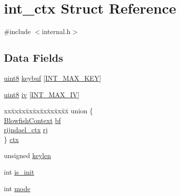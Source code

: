 \hypertarget{structint__ctx}{\section{int\-\_\-ctx Struct Reference}
\label{structint__ctx}
}


{\ttfamily \#include $<$internal.\-h$>$}

\subsection*{Data Fields}
\begin{DoxyCompactItemize}
\item 
\hyperlink{c_8h_adde6aaee8457bee49c2a92621fe22b79}{uint8} \hyperlink{structint__ctx_a896ecf3eb20dd99e750c356fc44825e2}{keybuf} \mbox{[}\hyperlink{internal_8h_a1fe65048b594a3956020028c65e8519b}{I\-N\-T\-\_\-\-M\-A\-X\-\_\-\-K\-E\-Y}\mbox{]}
\item 
\hyperlink{c_8h_adde6aaee8457bee49c2a92621fe22b79}{uint8} \hyperlink{structint__ctx_ae931dacd2536e5b4ef71871e351cc6da}{iv} \mbox{[}\hyperlink{internal_8h_a1de738986ffa91bfcdf3277ce55e1223}{I\-N\-T\-\_\-\-M\-A\-X\-\_\-\-I\-V}\mbox{]}
\item 
\begin{tabbing}
xx\=xx\=xx\=xx\=xx\=xx\=xx\=xx\=xx\=\kill
union \{\\
\>\hyperlink{structBlowfishContext}{BlowfishContext} \hyperlink{structint__ctx_aac34653068b3f2179215d2d5cd2ace10}{bf}\\
\>\hyperlink{rijndael_8h_a2ee3f8edff4b0b6b1b668739d13a06fc}{rijndael\_ctx} \hyperlink{structint__ctx_ae6455e9eaa34ec09871fa52ec7becb77}{rj}\\
\} \hyperlink{structint__ctx_a752ea1cbe27058721c7f31696dd440f2}{ctx}\\

\end{tabbing}\item 
unsigned \hyperlink{structint__ctx_aa09fedf5414ec886700046bb5b52e9ec}{keylen}
\item 
int \hyperlink{structint__ctx_a1ec0a9b4938c69f8c3dda43f2df27367}{is\-\_\-init}
\item 
int \hyperlink{structint__ctx_a02e9a0634da59d3a196f14dcaed77df7}{mode}
\end{DoxyCompactItemize}


